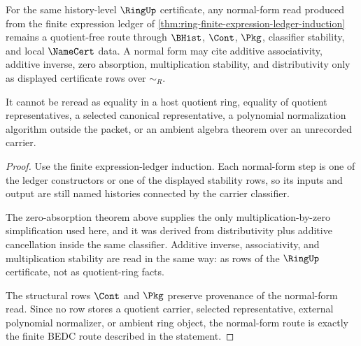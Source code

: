 \begin{theorem}
\label{thm:ring-quotient-free-normal-form-route}
For the same history-level $\RingUp$ certificate, any normal-form read produced from the finite expression ledger of \autoref{thm:ring-finite-expression-ledger-induction} remains a quotient-free route through $\BHist$, $\Cont$, $\Pkg$, classifier stability, and local $\NameCert$ data. A normal form may cite additive associativity, additive inverse, zero absorption, multiplication stability, and distributivity only as displayed certificate rows over $\sim_R$.

It cannot be reread as equality in a host quotient ring, equality of quotient representatives, a selected canonical representative, a polynomial normalization algorithm outside the packet, or an ambient algebra theorem over an unrecorded carrier.
\end{theorem}
\begin{proof}
Use the finite expression-ledger induction. Each normal-form step is one of the ledger constructors or one of the displayed stability rows, so its inputs and output are still named histories connected by the carrier classifier.

The zero-absorption theorem above supplies the only multiplication-by-zero simplification used here, and it was derived from distributivity plus additive cancellation inside the same classifier. Additive inverse, associativity, and multiplication stability are read in the same way: as rows of the $\RingUp$ certificate, not as quotient-ring facts.

The structural rows $\Cont$ and $\Pkg$ preserve provenance of the normal-form read. Since no row stores a quotient carrier, selected representative, external polynomial normalizer, or ambient ring object, the normal-form route is exactly the finite BEDC route described in the statement.
\end{proof}
